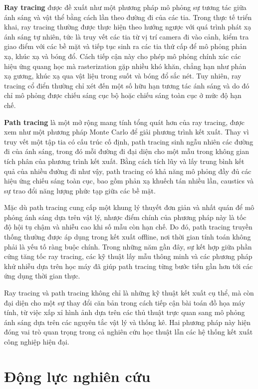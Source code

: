 \textbf{Ray tracing} được đề xuất như một phương pháp mô phỏng sự tương tác giữa ánh sáng và vật thể bằng cách lần theo đường đi của các tia. Trong thực tế triển khai, ray tracing thường được thực hiện theo hướng ngược với quá trình phát xạ ánh sáng tự nhiên, tức là truy vết các tia từ vị trí camera đi vào cảnh, kiểm tra giao điểm với các bề mặt và tiếp tục sinh ra các tia thứ cấp để mô phỏng phản xạ, khúc xạ và bóng đổ. Cách tiếp cận này cho phép mô phỏng chính xác các hiệu ứng quang học mà rasterization gặp nhiều khó khăn, chẳng hạn như phản xạ gương, khúc xạ qua vật liệu trong suốt và bóng đổ sắc nét. Tuy nhiên, ray tracing cổ điển thường chỉ xét đến một số hữu hạn tương tác ánh sáng và do đó chỉ mô phỏng được chiếu sáng cục bộ hoặc chiếu sáng toàn cục ở mức độ hạn chế.

\textbf{Path tracing} là một mở rộng mang tính tổng quát hơn của ray tracing, được xem như một phương pháp Monte Carlo để giải phương trình kết xuất. Thay vì truy vết một tập tia có cấu trúc cố định, path tracing sinh ngẫu nhiên các đường đi của ánh sáng, trong đó mỗi đường đi đại diện cho một mẫu trong không gian tích phân của phương trình kết xuất. Bằng cách tích lũy và lấy trung bình kết quả của nhiều đường đi như vậy, path tracing có khả năng mô phỏng đầy đủ các hiệu ứng chiếu sáng toàn cục, bao gồm phản xạ khuếch tán nhiều lần, caustics và sự trao đổi năng lượng phức tạp giữa các bề mặt.

Mặc dù path tracing cung cấp một khung lý thuyết đơn giản và nhất quán để mô phỏng ánh sáng dựa trên vật lý, nhược điểm chính của phương pháp này là tốc độ hội tụ chậm và nhiễu cao khi số mẫu còn hạn chế. Do đó, path tracing truyền thống thường được áp dụng trong kết xuất offline, nơi thời gian tính toán không phải là yếu tố ràng buộc chính. Trong những năm gần đây, sự kết hợp giữa phần cứng tăng tốc ray tracing, các kỹ thuật lấy mẫu thông minh và các phương pháp khử nhiễu dựa trên học máy đã giúp path tracing từng bước tiến gần hơn tới các ứng dụng thời gian thực.

Ray tracing và path tracing không chỉ là những kỹ thuật kết xuất cụ thể, mà còn đại diện cho một sự thay đổi căn bản trong cách tiếp cận bài toán đồ họa máy tính, từ việc xấp xỉ hình ảnh dựa trên các thủ thuật trực quan sang mô phỏng ánh sáng dựa trên các nguyên tắc vật lý và thống kê. Hai phương pháp này hiện đóng vai trò quan trọng trong cả nghiên cứu học thuật lẫn các hệ thống kết xuất công nghiệp hiện đại.

\section{Động lực nghiên cứu}

